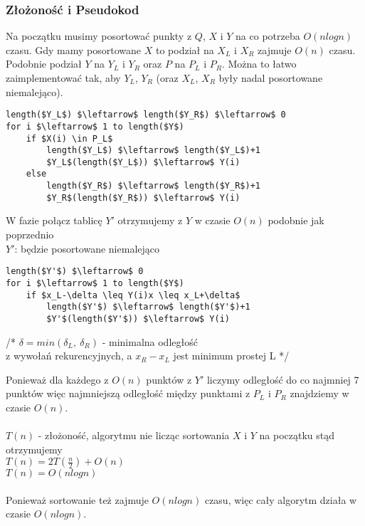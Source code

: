 \subsubsection{Złożoność i Pseudokod}
Na początku musimy posortować punkty z $Q$, $X$ i $Y$ na co potrzeba $O(nlogn)$ czasu. Gdy mamy posortowane $X$ to podział na $X_L$ i $X_R$ zajmuje $O(n)$ czasu. Podobnie podział $Y$ na $Y_L$ i $Y_R$ oraz $P$ na $P_L$ i $P_R$. Można to łatwo zaimplementować tak, aby $Y_L$, $Y_R$ (oraz $X_L$, $X_R$ były nadal posortowane niemalejąco).\\

\begin{lstlisting}
length($Y_L$) $\leftarrow$ length($Y_R$) $\leftarrow$ 0
for i $\leftarrow$ 1 to length($Y$)
	if $X(i) \in P_L$ 
    	length($Y_L$) $\leftarrow$ length($Y_L$)+1
    	$Y_L$(length($Y_L$)) $\leftarrow$ Y(i)
    else
    	length($Y_R$) $\leftarrow$ length($Y_R$)+1
    	$Y_R$(length($Y_R$)) $\leftarrow$ Y(i)
\end{lstlisting}

W fazie połącz tablicę $Y'$ otrzymujemy z $Y$ w czasie $O(n)$ podobnie jak poprzednio\\
\tab $Y'$: będzie posortowane niemalejąco

\begin{lstlisting}
length($Y'$) $\leftarrow$ 0
for i $\leftarrow$ 1 to length($Y$)
	if $x_L-\delta \leq Y(i)x \leq x_L+\delta$ 
    	length($Y'$) $\leftarrow$ length($Y'$)+1
    	$Y'$(length($Y'$)) $\leftarrow$ Y(i)
\end{lstlisting}

\begin{center}
/* $\delta = min(\delta_L,\ \delta_R)$ - minimalna odległość\\ z wywołań rekurencyjnych, a $x_R-x_L$ jest minimum prostej L */
\end{center}

Ponieważ dla każdego z $O(n)$ punktów z $Y'$ liczymy odległość do co najmniej 7 punktów więc najmniejszą odległość między punktami z $P_L$ i $P_R$ znajdziemy w czasie $O(n)$.\\
\\
$T(n)$ - złożoność, algorytmu nie licząc sortowania $X$ i $Y$ na początku stąd otrzymujemy\\
\tab $T(n) = 2T(\frac{n}{2})+O(n)$\\
\tab $T(n) = O(nlogn)$\\
\\
Ponieważ sortowanie też zajmuje $O(nlogn)$ czasu, więc cały algorytm działa w czasie $O(nlogn)$.